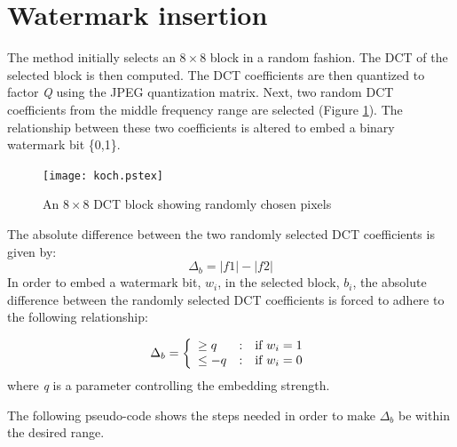 \documentclass[12pt]{report}
\begin{document}
\section{Watermark insertion}
	The method initially selects an $8 \times 8$ block in a random fashion. The DCT of the selected block 
	is then computed. The DCT coefficients are then quantized to factor \emph{Q} using the JPEG 
	quantization matrix.
	Next, two random DCT coefficients from the middle frequency range are selected (Figure \ref{figDctBlock}).
	The relationship between these two coefficients is altered to embed a binary watermark bit \{0,1\}.
	\begin{figure}[htb]
		\begin{center}
			\texttt{[image: koch.pstex]}
			\caption{An $8 \times 8$ DCT block showing randomly chosen pixels}
			\label{figDctBlock}
		\end{center}
	\end{figure}
	The absolute difference between the two randomly selected DCT coefficients is given by:
	\begin{equation}
		\Delta_{b} = |f1| - |f2|
	\end{equation}
	In order to embed a watermark bit, $w_{i}$, in the selected block, $b_{i}$,
	the absolute difference between the randomly selected DCT coefficients is
	forced to adhere to the following relationship:

	\begin{equation}
		\Delta_{b} = 	\left\{ 	\begin{array}{l@{\quad:\quad}l}
							\geq q  & \mbox{if $w_{i}=1$} \\
							\leq -q & \mbox{if $w_{i}=0$}
						\end{array}
				\right. 
	\end{equation}
	where \emph{q} is a parameter controlling the embedding strength.

	The following pseudo-code shows the steps needed in order to make
	$\Delta_{b}$ be within the desired range.
\end{document}
